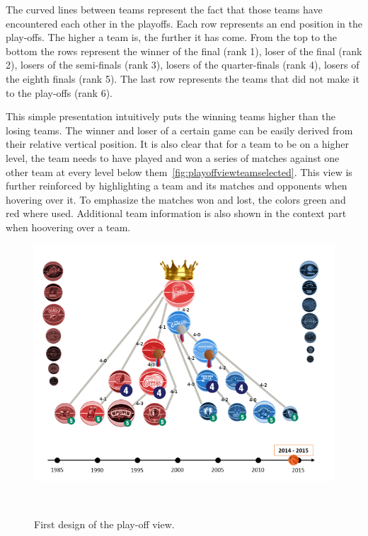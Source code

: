 \documentclass[]{sigchi}
\begin{document}
The curved lines between teams represent the fact that those teams have 
encountered each other in the playoffs. Each row represents an end position 
in the play-offs. The higher a team is, the further it has come.  From the 
top to the bottom the rows represent the winner of the final (rank 1), loser 
of the final (rank 2), losers of the semi-finals (rank 3), losers of the 
quarter-finals (rank 4), losers of the eighth finals (rank 5). The last row 
represents the teams that did not make it to the play-offs (rank 6). 

This simple presentation intuitively puts the winning teams higher than the
losing teams. The winner and loser of a certain game can be easily derived from 
their relative vertical position. It is also clear that for a team to be on a 
higher level, the team needs to have played and won a series of matches against 
one other team at every level below them~\ref{fig:playoffviewteamselected}. 
This view is further reinforced by highlighting a team and its matches and 
opponents when hovering over it. To emphasize the matches won and lost, the colors green
and red where used. Additional team information is also shown in the context part
when hoovering over a team.


\begin{figure}
\centering
  \includegraphics[width=1.0\columnwidth]{figures/playoffviewfirstdesign}
  \caption{First design of the play-off view.}~\label{fig:firstdesignplayoffview}
\end{figure}
\end{document}
